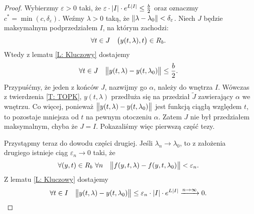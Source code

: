 \begin{proof}
  \noindent Wybierzmy $\varepsilon > 0$ taki, że $\varepsilon \cdot \abs{I} 
  \cdot e^{L \abs{I}} \leq \frac b2$ oraz oznaczmy $c^{\ast} = 
  \min(c,\delta_{\varepsilon})$. Weźmy $\lambda > 0$ taką, że $\norm{\lambda - 
  \lambda_0} < \delta_{\varepsilon}$. Niech $J$ będzie maksymalnym 
  podprzedziałem $I$, na którym zachodzi:
  \[
    \forall t \in J \quad \p[\big]{ y(t,\lambda), t } \in R_b.
  \]
  Wtedy z lematu \ref{L: Kluczowy} dostajemy
  \[
    \forall t \in J \quad \norm[\big]{ y(t,\lambda) - y(t,\lambda_0) } \leq 
    \frac b2.
  \]
  Przypuśćmy, że jeden z końców $J$, nazwijmy go $\alpha$, należy do wnętrza 
  $I$. Wówczas z twierdzenia \ref{T: TOPK}, $y(t,\lambda)$ przedłuża się na 
  przedział $\widetilde{J}$ zawierający $\alpha$ we wnętrzu. Co więcej, 
  ponieważ $\norm[\big]{ y(t,\lambda) - y(t,\lambda_0) }$ jest funkcją ciągłą 
  względem $t$, to pozostaje mniejsza od $t$ na pewnym otoczeniu $\alpha$. 
  Zatem $J$ nie był przedziałem maksymalnym, chyba że $J = I$. Pokazaliśmy więc 
  pierwszą część tezy.
  
  Przystąpmy teraz do dowodu części drugiej. Jeśli $\lambda_n \to \lambda_0$, 
  to z założenia drugiego istnieje ciąg $\varepsilon_n \to 0$ taki, że
  \[
    \forall (y,t) \in R_b \ \forall n \quad \norm[\big]{ f(y,t,\lambda) - 
    f(y,t,\lambda_0) } < \varepsilon_n.
  \]
  Z lematu \ref{L: Kluczowy} dostajemy
  \[
    \forall t \in I \quad \norm[\big]{ y(t,\lambda) - y(t,\lambda_0) } \leq 
    \varepsilon_n \cdot \abs{I} \cdot e^{L \abs{I}} \xrightarrow{n\to\infty} 0. 
    \qedhere
  \]
\end{proof}


































